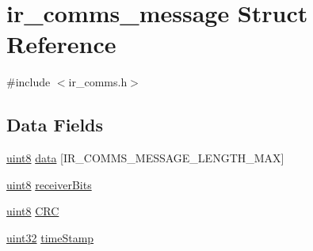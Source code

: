 \hypertarget{structir__comms__message}{
\section{ir\_\-comms\_\-message Struct Reference}
\label{structir__comms__message}
}


{\ttfamily \#include $<$ir\_\-comms.h$>$}

\subsection*{Data Fields}
\begin{DoxyCompactItemize}
\item 
\hyperlink{typedefs_8h_adde6aaee8457bee49c2a92621fe22b79}{uint8} \hyperlink{structir__comms__message_a3642527908fa71e0774115dc4250a720}{data} \mbox{[}IR\_\-COMMS\_\-MESSAGE\_\-LENGTH\_\-MAX\mbox{]}
\item 
\hyperlink{typedefs_8h_adde6aaee8457bee49c2a92621fe22b79}{uint8} \hyperlink{structir__comms__message_a7e633bbef09d0ef2d7095120ffa8f037}{receiverBits}
\item 
\hyperlink{typedefs_8h_adde6aaee8457bee49c2a92621fe22b79}{uint8} \hyperlink{structir__comms__message_aad085bc20d31ef89fc42943b748b917e}{CRC}
\item 
\hyperlink{typedefs_8h_a4b435a49c74bb91f284f075e63416cb6}{uint32} \hyperlink{structir__comms__message_a31a6fb7e84ba1a5614a08e128a487d91}{timeStamp}
\end{DoxyCompactItemize}



